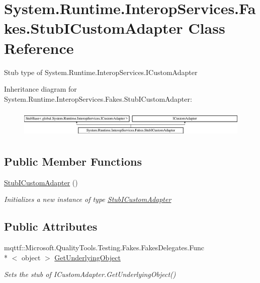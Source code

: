 \hypertarget{class_system_1_1_runtime_1_1_interop_services_1_1_fakes_1_1_stub_i_custom_adapter}{\section{System.\-Runtime.\-Interop\-Services.\-Fakes.\-Stub\-I\-Custom\-Adapter Class Reference}
\label{class_system_1_1_runtime_1_1_interop_services_1_1_fakes_1_1_stub_i_custom_adapter}
}


Stub type of System.\-Runtime.\-Interop\-Services.\-I\-Custom\-Adapter 


Inheritance diagram for System.\-Runtime.\-Interop\-Services.\-Fakes.\-Stub\-I\-Custom\-Adapter\-:\begin{figure}[H]
\begin{center}
\leavevmode
\includegraphics[height=1.369193cm]{class_system_1_1_runtime_1_1_interop_services_1_1_fakes_1_1_stub_i_custom_adapter}
\end{center}
\end{figure}
\subsection*{Public Member Functions}
\begin{DoxyCompactItemize}
\item 
\hyperlink{class_system_1_1_runtime_1_1_interop_services_1_1_fakes_1_1_stub_i_custom_adapter_a03b3b2329a7c78fe9d772875920b909a}{Stub\-I\-Custom\-Adapter} ()
\begin{DoxyCompactList}\small\item\em Initializes a new instance of type \hyperlink{class_system_1_1_runtime_1_1_interop_services_1_1_fakes_1_1_stub_i_custom_adapter}{Stub\-I\-Custom\-Adapter}\end{DoxyCompactList}\end{DoxyCompactItemize}
\subsection*{Public Attributes}
\begin{DoxyCompactItemize}
\item 
mqttf\-::\-Microsoft.\-Quality\-Tools.\-Testing.\-Fakes.\-Fakes\-Delegates.\-Func\\*
$<$ object $>$ \hyperlink{class_system_1_1_runtime_1_1_interop_services_1_1_fakes_1_1_stub_i_custom_adapter_a2c1bd1c16dab9035c46b8bce2de731f3}{Get\-Underlying\-Object}
\begin{DoxyCompactList}\small\item\em Sets the stub of I\-Custom\-Adapter.\-Get\-Underlying\-Object()\end{DoxyCompactList}\end{DoxyCompactItemize}


